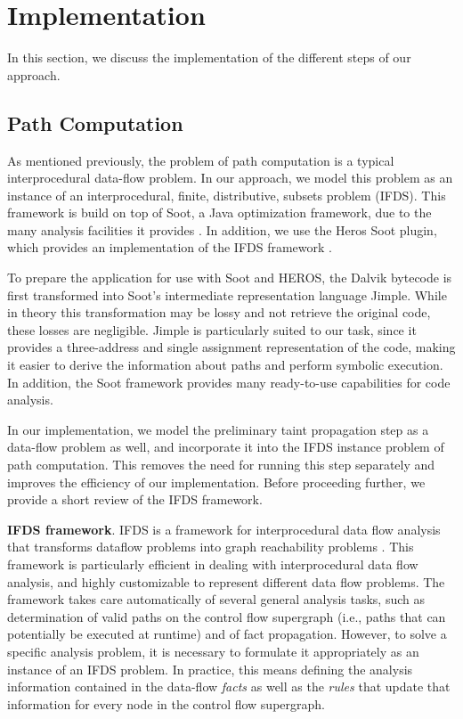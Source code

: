 \section{Implementation}
\label{sec:implementation}

In this section, we discuss the implementation of the different steps of our approach.

\subsection{Path Computation}
As mentioned previously, the problem of path computation is a typical interprocedural data-flow problem. In our approach, we model this problem as an instance of an interprocedural, finite, distributive, subsets problem (IFDS). This framework is build on top of Soot, a Java optimization framework, due to the many analysis facilities it provides \cite{heros,Bodden:2012:IDA:2259051.2259052,Vallee-Rai:1999:SJB:781995.782008}. In addition, we use the Heros Soot plugin, which provides an implementation of the IFDS framework \cite{heros}.

To prepare the application for use with Soot and HEROS, the Dalvik bytecode is first transformed into Soot's intermediate representation language Jimple. While in theory this transformation may be lossy and not retrieve the original code, these losses are negligible. Jimple is particularly suited to our task, since it provides a three-address and single assignment representation of the code, making it easier to derive the information about paths and perform symbolic execution. In addition, the Soot framework provides many ready-to-use capabilities for code analysis.

In our implementation, we model the preliminary taint propagation step as a data-flow problem as well, and incorporate it into the IFDS instance problem of path computation. This removes the need for running this step separately and improves the efficiency of our implementation. Before proceeding further, we provide a short review of the IFDS framework.

\noindent
\textbf{IFDS framework}.
IFDS is a framework for interprocedural data flow analysis that transforms dataflow problems into graph reachability problems \cite{ifds,Bodden:2012:IDA:2259051.2259052}. This framework  is particularly efficient in dealing with interprocedural data flow analysis, and highly customizable to represent different data flow problems. The framework takes care automatically of several general analysis tasks, such as
determination of valid paths on the control flow supergraph (i.e., paths that can potentially be executed at runtime) and of fact propagation. However, to solve a specific analysis problem, it is necessary to formulate it appropriately as an instance of an IFDS problem. In practice, this means defining the analysis information contained in the data-flow \emph{facts} as well as the \emph{rules} that update that information for every node in the control flow supergraph. 

